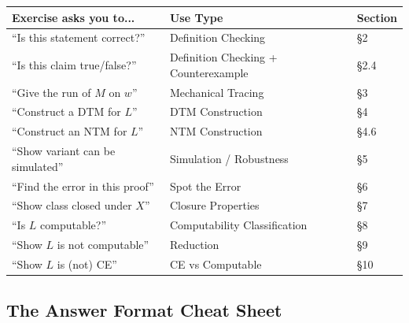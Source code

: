 \documentclass[11pt,a4paper]{article}
\begin{document}
\begin{center}
\renewcommand{\arraystretch}{1.4}
\begin{tabular}{l|l|l}
\toprule
\textbf{Exercise asks you to...} & \textbf{Use Type} & \textbf{Section} \\
\midrule
``Is this statement correct?'' & Definition Checking & \S2 \\
``Is this claim true/false?'' & Definition Checking + Counterexample & \S2.4 \\
``Give the run of $M$ on $w$'' & Mechanical Tracing & \S3 \\
``Construct a DTM for $L$'' & DTM Construction & \S4 \\
``Construct an NTM for $L$'' & NTM Construction & \S4.6 \\
``Show variant can be simulated'' & Simulation / Robustness & \S5 \\
``Find the error in this proof'' & Spot the Error & \S6 \\
``Show class closed under $X$'' & Closure Properties & \S7 \\
``Is $L$ computable?'' & Computability Classification & \S8 \\
``Show $L$ is not computable'' & Reduction & \S9 \\
``Show $L$ is (not) CE'' & CE vs Computable & \S10 \\
\bottomrule
\end{tabular}
\end{center}

\subsection{The Answer Format Cheat Sheet}
\end{document}
